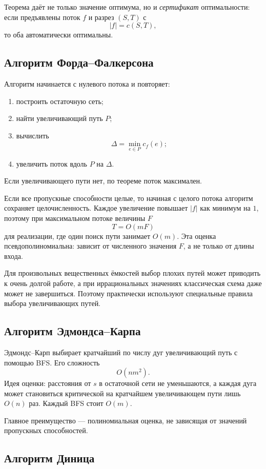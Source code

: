 Теорема даёт не только значение оптимума, но и \emph{сертификат} оптимальности:
если предъявлены поток $f$ и разрез $(S,T)$ с
\[
    |f|=c(S,T),
\]
то оба автоматически оптимальны.

\subsection{Алгоритм Форда--Фалкерсона}

Алгоритм начинается с нулевого потока и повторяет:
\begin{enumerate}
 \item построить остаточную сеть;
 \item найти увеличивающий путь $P$;
 \item вычислить
 \[
    \Delta=\min_{e\in P}c_f(e);
 \]
 \item увеличить поток вдоль $P$ на $\Delta$.
\end{enumerate}
Если увеличивающего пути нет, по теореме поток максимален.

Если все пропускные способности целые, то начиная с целого потока алгоритм
сохраняет целочисленность. Каждое увеличение повышает $|f|$ как минимум на $1$,
поэтому при максимальном потоке величины $F$
\[
    T=O(mF)
\]
для реализации, где один поиск пути занимает $O(m)$. Эта оценка
псевдополиномиальна: зависит от численного значения $F$, а не только от длины
входа.

Для произвольных вещественных ёмкостей выбор плохих путей может приводить к
очень долгой работе, а при иррациональных значениях классическая схема даже
может не завершиться. Поэтому практически используют специальные правила выбора
увеличивающих путей.

\subsection{Алгоритм Эдмондса--Карпа}

Эдмондс--Карп выбирает кратчайший по числу дуг увеличивающий путь с помощью BFS.
Его сложность
\[
    O(nm^2).
\]
Идея оценки: расстояния от $s$ в остаточной сети не уменьшаются, а каждая дуга
может становиться критической на кратчайшем увеличивающем пути лишь $O(n)$ раз.
Каждый BFS стоит $O(m)$.

Главное преимущество --- полиномиальная оценка, не зависящая от значений
пропускных способностей.

\subsection{Алгоритм Диница}

